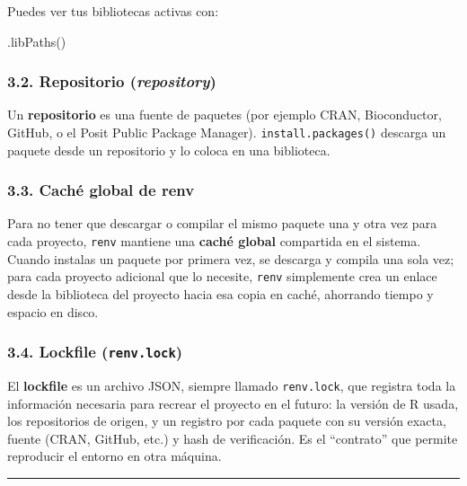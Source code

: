 \documentclass[
  man,
  floatsintext,
  longtable,
  a4paper,
  nolmodern,
  notxfonts,
  notimes,
  12pt,
  colorlinks=true,linkcolor=blue,citecolor=blue,urlcolor=blue]{apa7}
\newenvironment{Shaded}{\begin{snugshade}}{\end{snugshade}}
\newcommand{\FunctionTok}[1]{\textcolor[rgb]{0.28,0.35,0.67}{#1}}
\newcommand{\NormalTok}[1]{\textcolor[rgb]{0.00,0.23,0.31}{#1}}
\begin{document}
Puedes ver tus bibliotecas activas con:

\begin{Shaded}
\begin{Highlighting}[]
\FunctionTok{.libPaths}\NormalTok{()}
\end{Highlighting}
\end{Shaded}

\subsubsection{\texorpdfstring{3.2. Repositorio
(\emph{repository})}{3.2. Repositorio (repository)}}\label{repositorio-repository}

Un \textbf{repositorio} es una fuente de paquetes (por ejemplo CRAN,
Bioconductor, GitHub, o el Posit Public Package Manager).
\texttt{install.packages()} descarga un paquete desde un repositorio y
lo coloca en una biblioteca.

\subsubsection{3.3. Caché global de renv}\label{cachuxe9-global-de-renv}

Para no tener que descargar o compilar el mismo paquete una y otra vez
para cada proyecto, \texttt{renv} mantiene una \textbf{caché global}
compartida en el sistema. Cuando instalas un paquete por primera vez, se
descarga y compila una sola vez; para cada proyecto adicional que lo
necesite, \texttt{renv} simplemente crea un enlace desde la biblioteca
del proyecto hacia esa copia en caché, ahorrando tiempo y espacio en
disco.

\subsubsection{\texorpdfstring{3.4. Lockfile
(\texttt{renv.lock})}{3.4. Lockfile (renv.lock)}}\label{lockfile-renv.lock}

El \textbf{lockfile} es un archivo JSON, siempre llamado
\texttt{renv.lock}, que registra toda la información necesaria para
recrear el proyecto en el futuro: la versión de R usada, los
repositorios de origen, y un registro por cada paquete con su versión
exacta, fuente (CRAN, GitHub, etc.) y hash de verificación. Es el
``contrato'' que permite reproducir el entorno en otra máquina.

\begin{center}\rule{0.5\linewidth}{0.5pt}\end{center}
\end{document}
